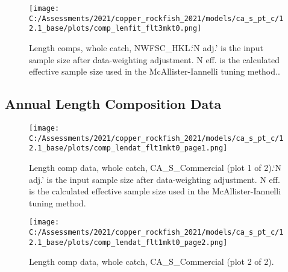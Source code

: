 \documentclass[11pt,
  english,
  a4paper,
]{article}
\begin{document}
\begin{figure}
\centering
\texttt{[image: C:/Assessments/2021/copper\_rockfish\_2021/models/ca\_s\_pt\_c/12.1\_base/plots/comp\_lenfit\_flt3mkt0.png]}
\caption{Length comps, whole catch, NWFSC\_HKL.`N adj.' is the input sample size after data-weighting adjustment. N eff. is the calculated effective sample size used in the McAllister-Iannelli tuning method..\label{fig:comp_lenfit_flt3mkt0}}
\end{figure}

\tagmcend\tagstructend

\newpage


\hypertarget{length-data}{%
\subsection{Annual Length Composition Data}\label{length-data}}

\leavevmode\tagmcend\tagstructend


\begin{figure}
\centering
\texttt{[image: C:/Assessments/2021/copper\_rockfish\_2021/models/ca\_s\_pt\_c/12.1\_base/plots/comp\_lendat\_flt1mkt0\_page1.png]}
\caption{Length comp data, whole catch, CA\_S\_Commercial (plot 1 of 2).`N adj.' is the input sample size after data-weighting adjustment. N eff. is the calculated effective sample size used in the McAllister-Iannelli tuning method.\label{fig:comp_lendat_flt1mkt0_page1}}
\end{figure}

\tagmcend\tagstructend


\begin{figure}
\centering
\texttt{[image: C:/Assessments/2021/copper\_rockfish\_2021/models/ca\_s\_pt\_c/12.1\_base/plots/comp\_lendat\_flt1mkt0\_page2.png]}
\caption{Length comp data, whole catch, CA\_S\_Commercial (plot 2 of 2).\label{fig:comp_lendat_flt1mkt0_page2}}
\end{figure}
\end{document}
